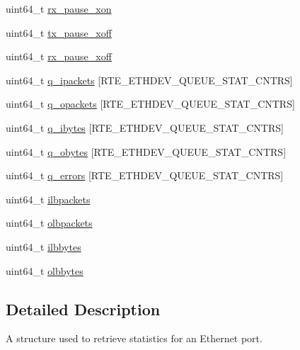 \begin{DoxyCompactItemize}
\item 
uint64\+\_\+t \hyperlink{structrte__eth__stats_a426fcfeeda8b8ca5cda9bccbb96fa554}{rx\+\_\+pause\+\_\+xon}
\item 
uint64\+\_\+t \hyperlink{structrte__eth__stats_a0585fd6c2b493d1a227b7a2cc9dedad3}{tx\+\_\+pause\+\_\+xoff}
\item 
uint64\+\_\+t \hyperlink{structrte__eth__stats_ae5db296a3ba987c8543a66d92dc923e1}{rx\+\_\+pause\+\_\+xoff}
\item 
uint64\+\_\+t \hyperlink{structrte__eth__stats_ad9a5051f6330c0125a3d6d7faf0a01bc}{q\+\_\+ipackets} \mbox{[}R\+T\+E\+\_\+\+E\+T\+H\+D\+E\+V\+\_\+\+Q\+U\+E\+U\+E\+\_\+\+S\+T\+A\+T\+\_\+\+C\+N\+T\+R\+S\mbox{]}
\item 
uint64\+\_\+t \hyperlink{structrte__eth__stats_a948a1e3c16353ae1879d7f76307ce41f}{q\+\_\+opackets} \mbox{[}R\+T\+E\+\_\+\+E\+T\+H\+D\+E\+V\+\_\+\+Q\+U\+E\+U\+E\+\_\+\+S\+T\+A\+T\+\_\+\+C\+N\+T\+R\+S\mbox{]}
\item 
uint64\+\_\+t \hyperlink{structrte__eth__stats_a90f0b86c63ff4ba82d191030f29a9dcf}{q\+\_\+ibytes} \mbox{[}R\+T\+E\+\_\+\+E\+T\+H\+D\+E\+V\+\_\+\+Q\+U\+E\+U\+E\+\_\+\+S\+T\+A\+T\+\_\+\+C\+N\+T\+R\+S\mbox{]}
\item 
uint64\+\_\+t \hyperlink{structrte__eth__stats_ada241648f7f27179bb65658b9d412618}{q\+\_\+obytes} \mbox{[}R\+T\+E\+\_\+\+E\+T\+H\+D\+E\+V\+\_\+\+Q\+U\+E\+U\+E\+\_\+\+S\+T\+A\+T\+\_\+\+C\+N\+T\+R\+S\mbox{]}
\item 
uint64\+\_\+t \hyperlink{structrte__eth__stats_aaf39205f9c73f5b800cde7ccdadda59e}{q\+\_\+errors} \mbox{[}R\+T\+E\+\_\+\+E\+T\+H\+D\+E\+V\+\_\+\+Q\+U\+E\+U\+E\+\_\+\+S\+T\+A\+T\+\_\+\+C\+N\+T\+R\+S\mbox{]}
\item 
uint64\+\_\+t \hyperlink{structrte__eth__stats_ac5547c65328b65565b8fa8f65e36f10e}{ilbpackets}
\item 
uint64\+\_\+t \hyperlink{structrte__eth__stats_a7c29127c73fd1f620335984959f7deff}{olbpackets}
\item 
uint64\+\_\+t \hyperlink{structrte__eth__stats_acbe9b5f40d03077d02c14f87a0f260d6}{ilbbytes}
\item 
uint64\+\_\+t \hyperlink{structrte__eth__stats_ae27a2b477810d5cccd3f1ebf092548b7}{olbbytes}
\end{DoxyCompactItemize}


\subsection{Detailed Description}
A structure used to retrieve statistics for an Ethernet port. 

